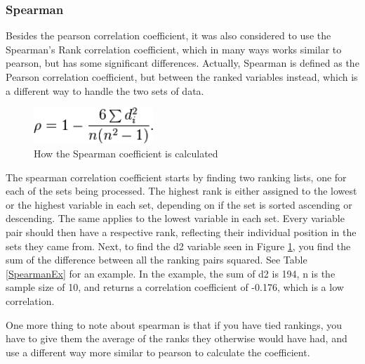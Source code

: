 \subsubsection{Spearman}

Besides the pearson correlation coefficient, it was also considered to use the Spearman’s Rank correlation coefficient, which in many ways works similar to pearson, but has some significant differences. Actually, Spearman is defined as the Pearson correlation coefficient, but between the ranked variables instead, which is a different way to handle the two sets of data. \cite{Spearman2}

\begin{figure}[htb]
\centering
\includegraphics[width=0.4\textwidth]{Images/SpearmanCalc.png}
\caption{How the Spearman coefficient is calculated}
\label{SpearCalc}
\end{figure}

The spearman correlation coefficient starts by finding two ranking lists, one for each of the sets being processed. The highest rank is either assigned to the lowest or the highest variable in each set, depending on if the set is sorted ascending or descending. The same applies to the lowest variable in each set. Every variable pair should then have a respective rank, reflecting their individual position in the sets they came from. Next, to find the d2 variable seen in Figure \ref{SpearCalc}, you find the sum of the difference between all the ranking pairs squared. See Table \ref{SpearmanEx} for an example. In the example, the sum of d2 is 194, n is the sample size of 10, and returns a correlation coefficient of -0.176, which is a low correlation. \cite{Spearman2}

One more thing to note about spearman is that if you have tied rankings, you have to give them the average of the ranks they otherwise would have had, and use a different way more similar to pearson to calculate the coefficient. \cite{Spearman1}

